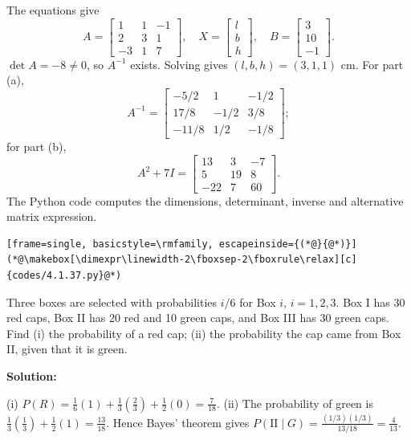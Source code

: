 \documentclass[journal]{IEEEtran}
\begin{document}
\begin{list}{}
The equations give
\[
A=\begin{bmatrix}1&1&-1\\2&3&1\\-3&1&7\end{bmatrix},\quad
X=\begin{bmatrix}l\\b\\h\end{bmatrix},\quad
B=\begin{bmatrix}3\\10\\-1\end{bmatrix}.
\]
$\det A=-8\ne0$, so $A^{-1}$ exists. Solving gives $(l,b,h)=(3,1,1)$ cm. For part (a),
\[
A^{-1}=\begin{bmatrix}-5/2&1&-1/2\\17/8&-1/2&3/8\\-11/8&1/2&-1/8\end{bmatrix};
\]
for part (b),
\[
A^2+7I=\begin{bmatrix}13&3&-7\\5&19&8\\-22&7&60\end{bmatrix}.
\]
The Python code computes the dimensions, determinant, inverse and alternative matrix expression.
\begin{lstlisting}[frame=single, basicstyle=\rmfamily, escapeinside={(*@}{@*)}]
(*@\makebox[\dimexpr\linewidth-2\fboxsep-2\fboxrule\relax][c]{codes/4.1.37.py}@*)
\end{lstlisting}

\item[4.1.38] Three boxes are selected with probabilities $i/6$ for Box $i$, $i=1,2,3$. Box I has 30 red caps, Box II has 20 red and 10 green caps, and Box III has 30 green caps. Find (i) the probability of a red cap; (ii) the probability the cap came from Box II, given that it is green.

\vspace{0.6em}\par\noindent\textbf{Solution:}

(i) $P(R)=\frac16(1)+\frac13(\frac23)+\frac12(0)=\boxed{\frac7{18}}$. (ii) The probability of green is $\frac13(\frac13)+\frac12(1)=\frac{13}{18}$. Hence Bayes' theorem gives $P(\text{II}\mid G)=\frac{(1/3)(1/3)}{13/18}=\boxed{\frac4{13}}$.
\end{list}
\end{document}
